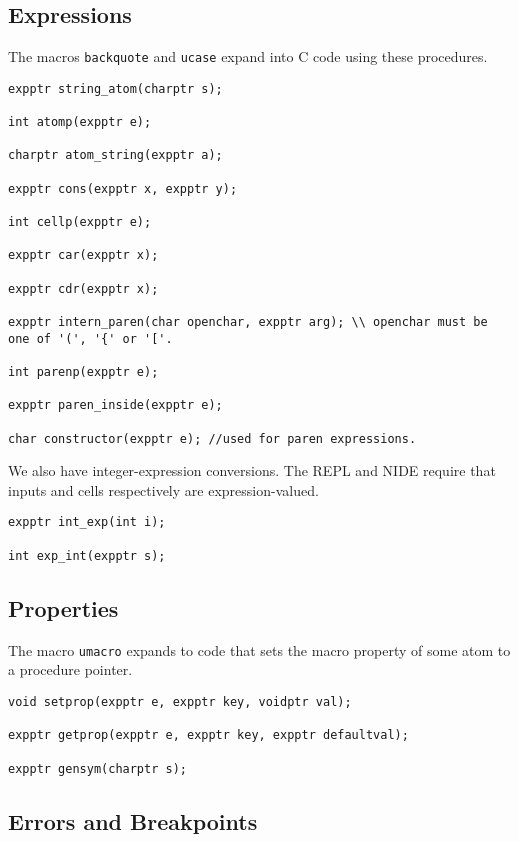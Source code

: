\documentclass{article}
\begin{document}
\subsection{Expressions}

The macros {\tt backquote} and {\tt ucase} expand into C code using these procedures.

\begin{verbatim}
expptr string_atom(charptr s);

int atomp(expptr e);

charptr atom_string(expptr a);

expptr cons(expptr x, expptr y);

int cellp(expptr e);

expptr car(expptr x);

expptr cdr(expptr x);

expptr intern_paren(char openchar, expptr arg); \\ openchar must be one of '(', '{' or '['.

int parenp(expptr e);

expptr paren_inside(expptr e);

char constructor(expptr e); //used for paren expressions.
\end{verbatim}

We also have integer-expression conversions.  The REPL and NIDE require that inputs and cells respectively are expression-valued.

\begin{verbatim}
expptr int_exp(int i);

int exp_int(expptr s);
\end{verbatim}

\subsection{Properties}

The macro {\tt umacro} expands to code that
sets the macro property of some atom to a procedure pointer.

\begin{verbatim}
void setprop(expptr e, expptr key, voidptr val);

expptr getprop(expptr e, expptr key, expptr defaultval);

expptr gensym(charptr s);
\end{verbatim}

\subsection{Errors and Breakpoints}
\end{document}
